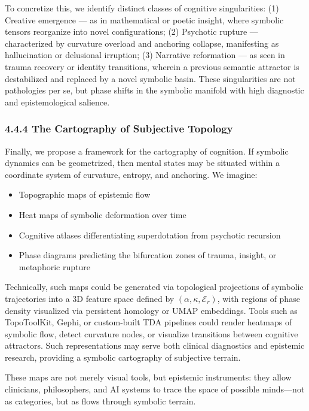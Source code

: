 To concretize this, we identify distinct classes of cognitive singularities: (1) Creative emergence — as in mathematical or poetic insight, where symbolic tensors reorganize into novel configurations; (2) Psychotic rupture — characterized by curvature overload and anchoring collapse, manifesting as hallucination or delusional irruption; (3) Narrative reformation — as seen in trauma recovery or identity transitions, wherein a previous semantic attractor is destabilized and replaced by a novel symbolic basin. These singularities are not pathologies per se, but phase shifts in the symbolic manifold with high diagnostic and epistemological salience.

\subsubsection*{4.4.4 The Cartography of Subjective Topology}

Finally, we propose a framework for the cartography of cognition. If symbolic dynamics can be geometrized, then mental states may be situated within a coordinate system of curvature, entropy, and anchoring. We imagine:
\begin{itemize}
\item Topographic maps of epistemic flow
\item Heat maps of symbolic deformation over time
\item Cognitive atlases differentiating superdotation from psychotic recursion
\item Phase diagrams predicting the bifurcation zones of trauma, insight, or metaphoric rupture
\end{itemize}

Technically, such maps could be generated via topological projections of symbolic trajectories into a 3D feature space defined by $(\alpha, \kappa, \mathcal{E}_r)$, with regions of phase density visualized via persistent homology or UMAP embeddings. Tools such as TopoToolKit, Gephi, or custom-built TDA pipelines could render heatmaps of symbolic flow, detect curvature nodes, or visualize transitions between cognitive attractors. Such representations may serve both clinical diagnostics and epistemic research, providing a symbolic cartography of subjective terrain.

These maps are not merely visual tools, but epistemic instruments: they allow clinicians, philosophers, and AI systems to trace the space of possible minds—not as categories, but as flows through symbolic terrain.

